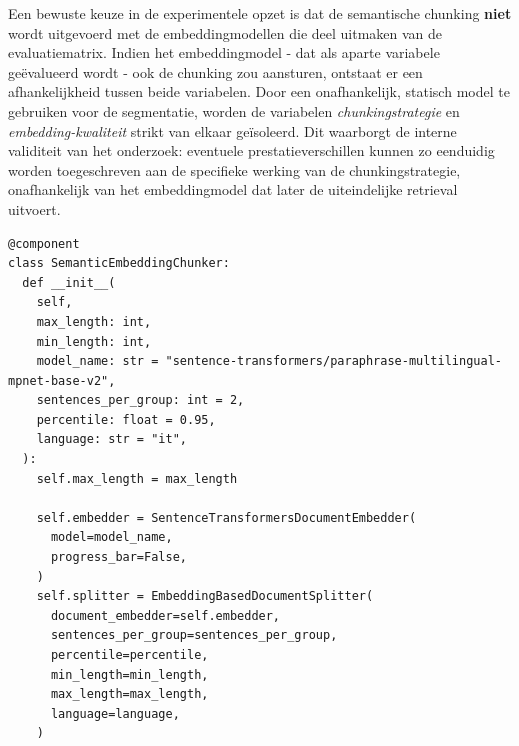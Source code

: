 Een bewuste keuze in de experimentele opzet is dat de semantische chunking \textbf{niet} wordt uitgevoerd met de embeddingmodellen die deel uitmaken van de evaluatiematrix. Indien het embeddingmodel - dat als aparte variabele geëvalueerd wordt - ook de chunking zou aansturen, ontstaat er een afhankelijkheid tussen beide variabelen. Door een onafhankelijk, statisch model te gebruiken voor de segmentatie, worden de variabelen \textit{chunkingstrategie} en \textit{embedding-kwaliteit} strikt van elkaar geïsoleerd. Dit waarborgt de interne validiteit van het onderzoek: eventuele prestatieverschillen kunnen zo eenduidig worden toegeschreven aan de specifieke werking van de chunkingstrategie, onafhankelijk van het embeddingmodel dat later de uiteindelijke retrieval uitvoert.

\begin{listing}[H]
\begin{verbatim}
@component
class SemanticEmbeddingChunker:
  def __init__(
    self,
    max_length: int,
    min_length: int,
    model_name: str = "sentence-transformers/paraphrase-multilingual-mpnet-base-v2",
    sentences_per_group: int = 2,
    percentile: float = 0.95,
    language: str = "it",
  ):
    self.max_length = max_length

    self.embedder = SentenceTransformersDocumentEmbedder(
      model=model_name,
      progress_bar=False,
    )
    self.splitter = EmbeddingBasedDocumentSplitter(
      document_embedder=self.embedder,
      sentences_per_group=sentences_per_group,
      percentile=percentile,
      min_length=min_length,
      max_length=max_length,
      language=language,
    )
\end{verbatim}
\caption[SemanticEmbeddingChunker: betekenisgrens-detectie]{De semantische chunker combineert een embedder en een splitter om grenzen te detecteren op basis van het 95e percentiel van de cosine-afstanden tussen zinnen.}
\label{lst:semantic-chunker}
\end{listing}

